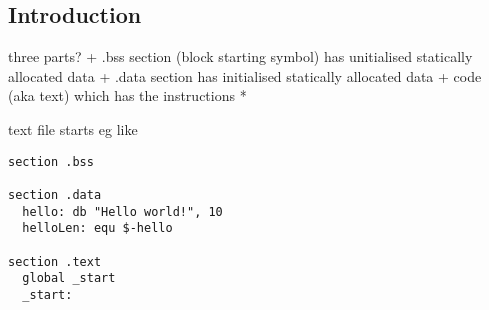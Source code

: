 
\subsection{Introduction}

three parts?
+ .bss section (block starting symbol) has unitialised statically allocated data
+ .data section has initialised statically allocated data
+ code (aka text) which has the instructions
  * 

text file starts eg like

\begin{verbatim}
section .bss

section .data
  hello: db "Hello world!", 10
  helloLen: equ $-hello

section .text
  global _start
  _start:
\end{verbatim}

